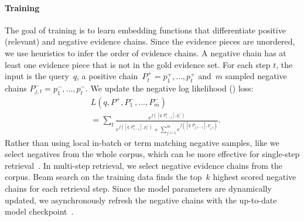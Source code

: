 \paragraph{Training \name{}}

The goal of training is to learn embedding functions that
differentiate positive (relevant) and negative evidence chains.
%
Since the evidence pieces are unordered, we use heuristics to infer the order of evidence chains.
%
A negative chain has at least one evidence piece that is not in the gold 
evidence set. 
For each step $t$, the input is
the query~$q$, a positive chain~$P_{t}^{+} = p^{+}_{1},\dots,p^{+}_{t}$
and~$m$ sampled negative chains $P_{j, t}^{-} = p^{-}_{1},\dots,p^{-}_{t}$. 
We update the negative log likelihood () loss:
\begin{align}
  &L(q, P^{+}, P_{1}^{-}, ..., P_{m}^{-})   \\
  &=\sum_{t}{\frac{e^{f([q;P_{t-1}^{+}], p^{+}_{t})}}{e^{f([q;P_{t-1}^{+}], p^{+}_{t})} + \sum_{j=1}^{m} {e^{f([q;P_{j, t-1}], p^{-}_{j, t})}}}}.\nonumber
  \label{eqn:loss}
\end{align}
Rather than using local in-batch or term matching negative samples,
like \citet{guu2020realm} we select negatives from the whole corpus,
which can be more effective for single-step
retrieval~\cite{xiong2020approximate}.
%
In multi-step retrieval, we select negative evidence chains from the corpus.
Beam search on the training data finds the top~$k$
highest scored negative chains for each retrieval step. Since the model parameters are dynamically updated, 
we asynchronously refresh the negative chains with 
the up-to-date model checkpoint~\cite{guu2020realm, xiong2020approximate}. 


